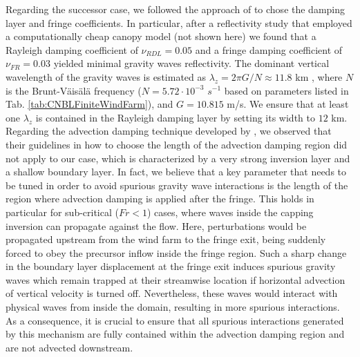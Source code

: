 \documentclass[journal abbreviation, manuscript]{copernicus}
\begin{document}
Regarding the successor case, we followed the approach of \cite{2022a_LanzilaoMeyers} to chose the damping layer and fringe coefficients. In particular, after a reflectivity study that employed a computationally cheap canopy model (not shown here) we found that a Rayleigh damping coefficient of $\nu_{RDL}=0.05$ and a fringe damping coefficient of $\nu_{FR} = 0.03$ yielded minimal gravity waves reflectivity. The dominant vertical wavelength of the gravity waves is estimated as $\lambda_z = 2\pi G/N \approx 11.8$ km \citep{2017a_AllaertsMeyers}, where $N$ is the Brunt-V\"ais\"al\"a frequency ($N=5.72\cdot10^{-3}$ $s^{-1}$ based on parameters listed in Tab. \ref{tab:CNBLFiniteWindFarm}), and $G=10.815$ m/s. We ensure that at least one $\lambda_z$ is contained in the Rayleigh damping layer by setting its width to $12$ km. Regarding the advection damping technique developed by \cite{2022a_LanzilaoMeyers}, we observed that their guidelines in how to choose the length of the advection damping region did not apply to our case, which is characterized by a very strong inversion layer and a shallow boundary layer. In fact, we believe that a key parameter that needs to be tuned in order to avoid spurious gravity wave interactions is the length of the region where advection damping is applied after the fringe. This holds in particular for sub-critical ($Fr<1$) cases, where waves inside the capping inversion can propagate against the flow. Here, perturbations would be propagated upstream from the wind farm to the fringe exit, being suddenly forced to obey the precursor inflow inside the fringe region. Such a sharp change in the boundary layer displacement at the fringe exit induces spurious gravity waves which remain trapped at their streamwise location if horizontal advection of vertical velocity is turned off. Nevertheless, these waves would interact with physical waves from inside the domain, resulting in more spurious interactions. As a consequence, it is crucial to ensure that all spurious interactions generated by this mechanism are fully contained within the advection damping region and are not advected downstream. \\
\end{document}
